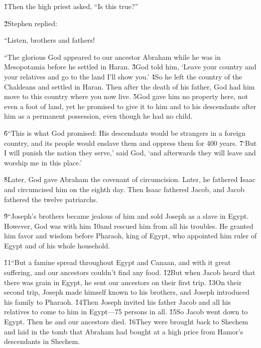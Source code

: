 \v{1}Then the high priest asked, ``Is this true?''

\v{2}Stephen replied:

``Listen, brothers and fathers!

``The glorious God appeared to our ancestor Abraham while he was in Mesopotamia before he settled in Haran. \v{3}God told him, `Leave your country and your relatives and go to the land I'll show you.' \v{4}So he left the country of the Chaldeans and settled in Haran. Then after the death of his father, God had him move to this country where you now live. \v{5}God gave him no property here, not even a foot of land, yet he promised to give it to him and to his descendants after him as a permanent possession, even though he had no child.

\v{6}``This is what God promised: His descendants would be strangers in a foreign country, and its people would enslave them and oppress them for 400 years. \v{7}`But I will punish the nation they serve,' said God, `and afterwards they will leave and worship me in this place.'

\v{8}Later, God gave Abraham the covenant of circumcision. Later, he fathered Isaac and circumcised him on the eighth day. Then Isaac fathered Jacob, and Jacob fathered the twelve patriarchs.

\v{9}``Joseph's brothers became jealous of him and sold Joseph as a slave in Egypt. However, God was with him \v{10}and rescued him from all his troubles. He granted him favor and wisdom before Pharaoh, king of Egypt, who appointed him ruler of Egypt and of his whole household.

\v{11}``But a famine spread throughout Egypt and Canaan, and with it great suffering, and our ancestors couldn't find any food. \v{12}But when Jacob heard that there was grain in Egypt, he sent our ancestors on their first trip. \v{13}On their second trip, Joseph made himself known to his brothers, and Joseph introduced his family to Pharaoh. \v{14}Then Joseph invited his father Jacob and all his relatives to come to him in Egypt---75 persons in all. \v{15}So Jacob went down to Egypt. Then he and our ancestors died. \v{16}They were brought back to Shechem and laid in the tomb that Abraham had bought at a high price from Hamor's descendants in Shechem.

